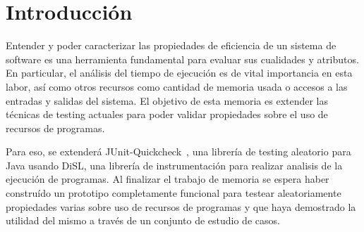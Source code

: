\section{Introducción}
Entender y poder caracterizar las propiedades de eficiencia de un
sistema de software es una herramienta fundamental para evaluar sus cualidades y atributos.
En particular, el análisis del tiempo de ejecución es de vital importancia en
esta labor, así como otros recursos como cantidad de memoria usada o accesos a
las entradas y salidas del sistema. El objetivo de esta memoria es extender las
técnicas de testing actuales para poder validar propiedades sobre el uso de
recursos de programas.

Para eso, se extenderá JUnit-Quickcheck~\cite{pholser}, una librería
de testing aleatorio para Java usando DiSL, una librería de instrumentación para
realizar analisis de la ejecución de programas.
Al finalizar el trabajo de memoria se espera haber construído
un prototipo completamente funcional para testear aleatoriamente propiedades
varias sobre uso de recursos de programas y que haya demostrado la utilidad del
mismo a través de un conjunto de estudio de casos.
